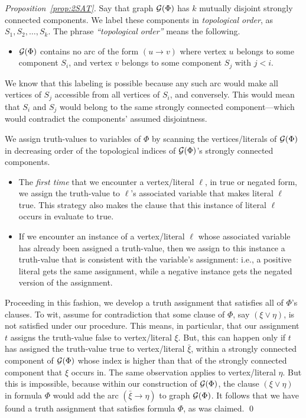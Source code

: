 \begin{proof}[Proposition~\ref{prop:2SAT}]
Say that graph $\mbox{$\cal G$}(\Phi)$ has $k$ mutually disjoint strongly connected components.  We label these components in {\it topological order}, as $S_1, S_2, \ldots, S_k$.  The phrase
{\it ``topological order''} means the following.
\begin{itemize}
\item
$\mbox{$\cal G$}(\Phi)$ contains no arc of the form $(u \rightarrow v)$ where vertex $u$ belongs to some component $S_i$, and vertex $v$ belongs to some component $S_j$ with $j < i$.
\end{itemize}
We know that this labeling is possible because any such arc would make all vertices of $S_j$ accessible from all vertices of $S_i$, and conversely.  This would mean that $S_i$ and $S_j$ would belong to the same strongly connected component---which would contradict the components' assumed disjointness.

\medskip

We assign truth-values to variables of $\Phi$ by scanning the vertices/literals of $\mbox{$\cal G$}(\Phi)$ in decreasing order of the topological indices of $\mbox{$\cal G$}(\Phi)$'s strongly connected components.
\begin{itemize}
\item
The {\em first time} that we encounter a vertex/literal $\ell$, in true or negated form, we assign the truth-value to $\ell$'s associated variable that makes literal $\ell$ {\sc true}.  This strategy also makes the clause that this instance of literal $\ell$ occurs in evaluate to {\sc true}.
\medskip\item
If we encounter an instance of a vertex/literal $\ell$ whose associated variable has already been assigned a truth-value, then we assign to this instance a truth-value that is consistent with the
variable's assignment: i.e., a positive literal gets the same assignment, while a negative instance gets the negated version of the assignment.
\end{itemize}

Proceeding in this fashion, we develop a truth assignment that satisfies all of $\Phi$'s clauses.  To wit, assume for contradiction that some clause of $\Phi$, say $(\xi \vee \eta)$, is not satisfied
under our procedure.  This means, in particular, that our assignment $t$ assigns the truth-value {\sc false} to vertex/literal $\xi$.   But, this can happen only if $t$ has assigned the truth-value {\sc true} to vertex/literal $\bar{\xi}$, within a strongly connected component of $\mbox{$\cal G$}(\Phi)$ whose index is higher than that of the strongly connected component that $\xi$ occurs in.  The same observation applies to vertex/literal $\eta$.   But this is impossible, because within our construction of $\mbox{$\cal G$}(\Phi)$, the clause $(\xi \vee \eta)$ in formula $\Phi$ would add the arc $(\bar{\xi} \rightarrow \eta)$ to graph $\mbox{$\cal G$}(\Phi)$.  It follows that we have found a truth assignment that satisfies formula $\Phi$, as was claimed.  \qed
\end{proof}

